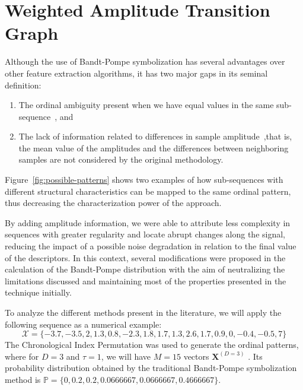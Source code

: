 \chapter{Weighted Amplitude Transition Graph}\label{chapter:WATG}

Although the use of Bandt-Pompe symbolization has several advantages over other feature extraction algorithms, it has two major gaps in its seminal definition: 
\begin{enumerate}[label=(\roman*)]
    \item  The ordinal ambiguity present when we have equal values in the same sub-sequence~\citep{Traversaro2018DDMI,Traversaro2017Empirical}, and
    \item The lack of information related to differences in sample amplitude~\citep{azami2016amplitude, Fadlallah2013Weightedpermutation, cuesta2019permutation},that is, the mean value of the amplitudes and the differences between neighboring samples are not considered by the original methodology.
\end{enumerate}
Figure~\ref{fig:possible-patterns} shows two examples of how sub-sequences with different structural characteristics can be mapped to the same ordinal pattern, thus decreasing the characterization power of the approach.

By adding amplitude information, we were able to attribute less complexity in sequences with greater regularity and locate abrupt changes along the signal, reducing the impact of a possible noise degradation in relation to the final value of the descriptors.
In this context, several modifications were proposed in the calculation of the Bandt-Pompe distribution with the aim of neutralizing the limitations discussed and maintaining most of the properties presented in the technique initially.

To analyze the different methods present in the literature, we will apply the following sequence as a numerical example:
\begin{equation}
    \mathcal{X} = \{-3.7, -3.5, 2, 1.3, 0.8, -2.3, 1.8, 1.7, 1.3, 2.6, 1.7, 0.9, 0, -0.4, -0.5, 7\}
	\label{eq:example}
\end{equation}
The Chronological Index Permutation was used to generate the ordinal patterns, where for $D = 3$ and $\tau = 1$, we will have $M = 15$ vectors $\mathbf{X}^{(D = 3)}$ .
Its probability distribution obtained by the traditional Bandt-Pompe symbolization method is
$\mathbb{P} = \{0, 0.2, 0.2, 0.0666667, 0.0666667, 0.4666667\}$.

